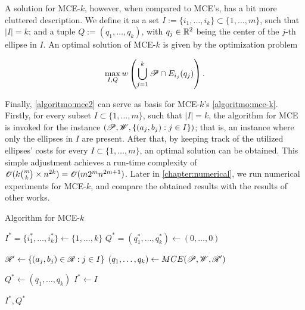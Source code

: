 A solution for MCE-$k$, however,  when compared to MCE's, has a bit more cluttered description. We define it as a set $I:=\{i_1, \dots, i_k\}\subset\{1, \dots, m\}$, such that $|I|=k$; and a tuple $Q:=(q_1, \dots, q_k)$, with $q_j\in\mathbb{R}^2$ being the center of the $j$-th ellipse in $I$. An optimal solution of MCE-$k$ is given by the optimization problem

\begin{equation*}
	\max_{I, Q} w\left(\bigcup_{j=1}^k \mathscr{P} \cap E_{i_j}(q_j)\right).
\end{equation*}

Finally, \autoref{algoritmo:mce2} can serve as basis for MCE-$k$'s \autoref{algoritmo:mce-k}. 
Firstly, for every subset $I \subset \{1, \dots, m\}$, such that $|I| = k$, the algorithm for MCE is invoked for the instance $(\mathscr{P}, \mathscr{W}, \{(a_j, b_j) : j \in I\})$; that is, an instance where only the ellipses in $I$ are present.
After that, by keeping track of the utilized ellipses' costs for every $I \subset \{1, \dots, m\}$, an optimal solution can be obtained.
This simple adjustment achieves a run-time complexity of $\mathscr{O}(k\binom{m}{k} \times n^{2k}) = \mathscr{O}(m2^mn^{2m+1})$. Later in \autoref{chapter:numerical}, we run numerical experiments for MCE-$k$, and compare the obtained results with the results of other works.

\begin{algoritmo}
	\caption{Algorithm for MCE-$k$}\label{algoritmo:mce-k}
	
	
	\begin{algorithmic}[1]
		
		\item[]
		
		\State $I^* = \{i_1^*, \dots, i_k^*\}\gets \{1, \dots, k\}$
		\State $Q^* = (q_1^*, \dots, q_k^*) \gets (0, \dots, 0)$
		
		
		\State $\mathscr{R}' \gets \{(a_j, b_j) \in \mathscr{R}: j \in I\}$
		\State $(q_1, \dots, q_k) \gets MCE(\mathscr{P}, \mathscr{W}, \mathscr{R}')$
		
		\State $Q^* \gets (q_1, \dots, q_k)$
		\State $I^* \gets I$
		\EndIf
		\EndFor
		
		\State \Return $I^*, Q^*$
		\EndProcedure
	\end{algorithmic}
\end{algoritmo}